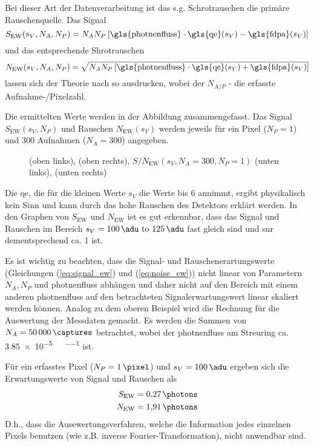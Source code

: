 \noindent
Bei dieser Art der Datenverarbeitung ist das s.g. Schrotrauschen die primäre Rauschenquelle. Das Signal 
\begin{equation}
        S_{\text{EW}}(s_V, N_A, N_P) = N_{A}N_{P}\left[\text{\gls{photnenfluss}}\cdot\text{\gls{qe}}(s_V) - \text{\gls{fdpa}}(s_V)\right]
        \label{eq:signal_ew}
\end{equation}
und das entsprechende Shrotrauschen 
\begin{equation}
        N_{\text{EW}}(s_V, N_A, N_P) = \sqrt{N_{A}N_{P}\left[\text{\gls{photnenfluss}}\cdot\text{\gls{qe}}(s_V) + \text{\gls{fdpa}}(s_V)\right]}
        \label{eq:noise_ew}
\end{equation}
lassen sich der Theorie nach so ausdrucken, wobei der $N_{A/P}$ - die erfasste Aufnahme-/Pixelzahl. 

\noindent
Die ermittelten Werte werden in der Abbildung zusammengefasst. Das Signal $S_{\text{EW}}(s_V, N_P)$ und Rauschen $ N_{\text{EW}}(s_V)$ werden jeweils für ein Pixel ($N_P = 1$) und 300 Aufnahmen ($N_A = 300$) angegeben.
\begin{figure}[H]
    \centering
    
    \caption{(oben links), (oben rechts), $S/N_{\text{EW}}(s_V, N_A = 300, N_P = 1)$ (unten links), (unten rechts)}
    \label{fig:qe_fehldetektiert_signal_noise}
\end{figure}
\noindent
Die \gls{qe}, die für die kleinen Werte $s_V$ die Werte bis 6 annimmt, ergibt physikalisch kein Sinn und kann durch das hohe Rauschen des Detektors erklärt werden. In den Graphen von $S_{\text{EW}}$ und $N_{\text{EW}}$ ist es gut erkennbar, dass das Signal und Rauschen im Bereich $s_V = \text{\SIrange{100}{125}{\adu}}$ fast gleich sind und \gls{snr} dementsprechend ca. 1 ist.

\noindent
Es ist wichtig zu beachten, dass die Signal- und Rauschenerartungswerte (Gleichungen (\ref{eq:signal_ew}) und  (\ref{eq:noise_ew})) nicht linear von Parametern $N_A, N_P$ und \gls{photnenfluss} abhängen und daher nicht auf den Bereich mit einem anderen \gls{photnenfluss} auf den betrachteten Signalerwartungswert linear skaliert werden können. Analog zu dem oberen Beispiel wird die Rechnung für die Auswertung der Messdaten gemacht. Es werden die Summen von $N_A = \SI{50000}{\captures}$ betrachtet, wobei der \gls{photnenfluss} am Streuring ca. \SI{3.85e-5}{\photons\per\pixel\per\capture} ist.

\noindent
Für ein erfasstes Pixel ($N_P = \SI{1}{\pixel}$) und $s_V = \SI{100}{\adu}$ ergeben sich die Erwartungswerte von Signal und Rauschen als
\begin{equation}
    \begin{split}
        S_\text{EW} &= \SI{0.27}{\photons}\\
        N_\text{EW} &= \SI{1.91}{\photons}\\
    \end{split}
\end{equation}
\noindent
D.h., dass die Ausewertungsverfahren, welche die Information jedes einzelnen Pixels benutzen (wie z.B. inverse Fourier-Transformation), nicht anwendbar sind.

